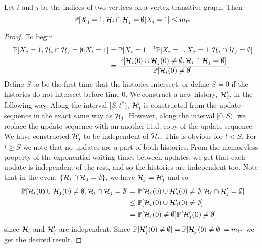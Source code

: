 	\begin{lemma}
		\label{lem: prob X_j and no intersect given X_i = 1}
		Let $i$ and $j$ be the indices of two vertices on a vertex transitive graph. Then
		\begin{equation}
			\mathbb{P}[X_j = 1, \mathcal{H}_i \cap\mathcal{H}_j = \emptyset|X_i = 1] \leq m_{t^*}
		\end{equation}
	\end{lemma}
	\begin{proof}
		To begin
		\begin{align}
			\mathbb{P}[X_j = 1, \mathcal{H}_i \cap\mathcal{H}_j = \emptyset|X_i = 1] &= \mathbb{P}[X_i = 1]^{-1}\mathbb{P}[X_i = 1, X_j = 1, \mathcal{H}_i \cap\mathcal{H}_j = \emptyset]\\
			&= \frac{\mathbb{P}[\mathcal{H}_i(0) \cup \mathcal{H}_j(0) \neq \emptyset, \mathcal{H}_i \cap \mathcal{H}_j = \emptyset]}{\mathbb{P}[\mathcal{H}_i(0) \neq \emptyset]}.
		\end{align}
		Define $S$ to be the first time that the histories intersect, or define $S = 0$ if the histories do not intersect before time $0$. We construct a new history, $\mathcal{H}_j'$, in the following way. Along the interval $[S, t^*)$, $\mathcal{H}_j'$ is constructed from the update sequence in the exact same way as $\mathcal{H}_j$. However, along the interval $[0, S)$, we replace the update sequence with an another i.i.d. copy of the update sequence. We have constructed $\mathcal{H}_j'$ to be independent of $\mathcal{H}_i$. This is obvious for $t < S$. For $t \geq S$ we note that no updates are a part of both histories. From the memoryless property of the exponential waiting times between updates, we get that each update is independent of the rest, and so the histories are independent too. Note that in the event $\{\mathcal{H}_i \cap \mathcal{H}_j = \emptyset\}$, we have $\mathcal{H}_j = \mathcal{H}_j'$ and so
		\begin{align}
			\mathbb{P}[\mathcal{H}_i(0) \cup \mathcal{H}_j(0) \neq \emptyset, \mathcal{H}_i \cap \mathcal{H}_j = \emptyset] &= \mathbb{P}[\mathcal{H}_i(0) \cup \mathcal{H}_j'(0) \neq \emptyset, \mathcal{H}_i \cap \mathcal{H}_j' = \emptyset]\\
			&\leq \mathbb{P}[\mathcal{H}_i(0) \cup \mathcal{H}_j'(0) \neq \emptyset]\\
			&= \mathbb{P}[\mathcal{H}_i(0) \neq \emptyset] \mathbb{P}[\mathcal{H}_j'(0) \neq \emptyset]
		\end{align}
		since $\mathcal{H}_i$ and $\mathcal{H}_j'$ are independent. Since $\mathbb{P}[\mathcal{H}_j'(0) \neq \emptyset] = \mathbb{P}[\mathcal{H}_j(0) \neq \emptyset] = m_{t^*}$ we get the desired result.
	\end{proof}

